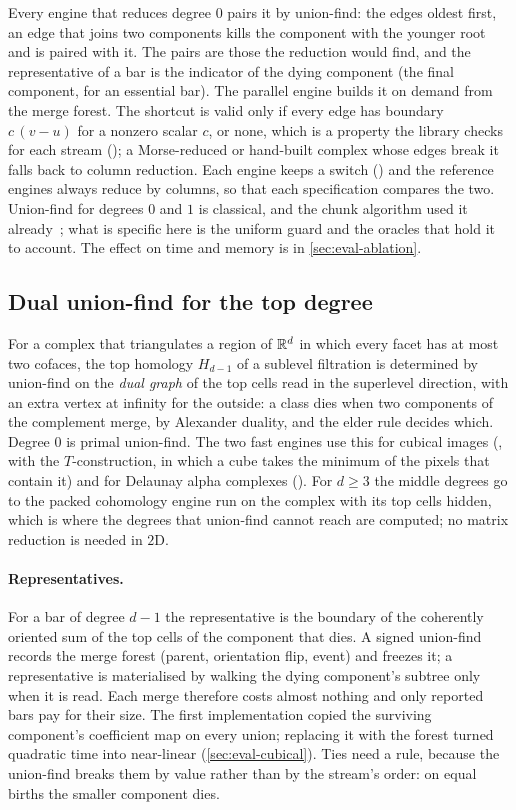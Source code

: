 Every engine that reduces degree $0$ pairs it by union-find: the edges oldest first, an edge that joins two components
kills the component with the younger root and is paired with it. The pairs are those the reduction would find, and the
representative of a bar is the indicator of the dying component (the final component, for an essential bar). The parallel
engine builds it on demand from the merge forest. The shortcut is valid only if every edge has boundary
$c\,(v-u)$ for a nonzero scalar $c$, or none, which is a property the library checks for each stream
(); a Morse-reduced or hand-built complex whose edges break it falls back to column reduction.
Each engine keeps a switch () and the reference engines always reduce by columns, so that each
specification compares the two. Union-find for degrees $0$ and $1$ is classical, and the chunk algorithm
used it already~\cite{bkr2014chunks}; what is specific here is the uniform guard and the oracles that hold it to account.
The effect on time and memory is in \cref{sec:eval-ablation}.

\subsection{Dual union-find for the top degree}\label{sec:dual-uf}

For a complex that triangulates a region of $\mathbb{R}^d$ in which every facet has at most two cofaces, the top homology
$H_{d-1}$ of a sublevel filtration is determined by union-find on the \emph{dual graph} of the top cells read in the
superlevel direction, with an extra vertex at infinity for the outside: a class dies when two components of the complement
merge, by Alexander duality, and the elder rule decides which. Degree $0$ is primal union-find. The two fast engines use this
for cubical images (, with the $T$-construction, in which a cube takes the minimum of the
pixels that contain it) and for Delaunay alpha complexes (). For $d\ge3$ the middle
degrees go to the packed cohomology engine run on the complex with its top cells hidden, which is where the degrees that
union-find cannot reach are computed; no matrix reduction is needed in $2$D.

\paragraph{Representatives.}
For a bar of degree $d-1$ the representative is the boundary of the coherently oriented sum of the top cells of the component
that dies. A signed union-find records the merge forest (parent, orientation flip, event) and freezes it; a representative is
materialised by walking the dying component's subtree only when it is read. Each merge therefore costs almost nothing and
only reported bars pay for their size. The first implementation copied the surviving component's coefficient map on every
union; replacing it with the forest turned quadratic time into near-linear (\cref{sec:eval-cubical}).
Ties need a rule, because the union-find breaks them by value rather than by the stream's order: on equal births the
smaller component dies.

